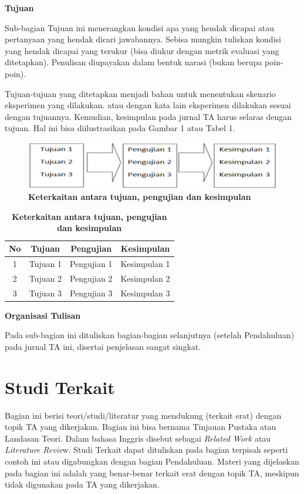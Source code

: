 \noindent\textbf{Tujuan}

Sub-bagian Tujuan ini menerangkan kondisi apa yang hendak dicapai atau pertanyaan yang hendak dicari jawabannya. Sebisa mungkin tuliskan kondisi yang hendak dicapai yang terukur (bisa diukur dengan metrik evaluasi yang ditetapkan).  
Penulisan diupayakan dalam bentuk narasi (bukan berupa poin-poin).

Tujuan-tujuan yang ditetapkan menjadi bahan untuk menentukan skenario eksperimen yang dilakukan. atau dengan kata lain eksperimen dilakukan sesuai dengan tujuannya. Kemudian, kesimpulan pada jurnal TA harus selaras dengan tujuan. Hal ini bisa diilustrasikan pada Gambar 1 atau Tabel 1.
\begin{figure}[h!]
\centering
\includegraphics[scale=0.30]{Tujuan.png}
\caption{\textbf{Keterkaitan antara tujuan, pengujian dan kesimpulan}}
\label{fig:tujuan}
\end{figure}

\begin{table}[h!]
\caption{\textbf{Keterkaitan antara tujuan, pengujian dan kesimpulan}}
\label{table:1}%
\centering
\begin{tabular}{| c | c  | c | c |} 
 \hline
 \textbf{No} & \textbf{Tujuan} & \textbf{Pengujian} & \textbf{Kesimpulan} \\ [0.5ex] 
 \hline
 1 & Tujuan 1 & Pengujian 1 & Kesimpulan 1 \\ 
 2 & Tujuan 2 & Pengujian 2 & Kesimpulan 2 \\ 
 3 & Tujuan 3 & Pengujian 3 & Kesimpulan 3 \\  [1ex] 
 \hline
\end{tabular}

\end{table}

\noindent \textbf{Organisasi Tulisan}

Pada sub-bagian ini dituliskan bagian-bagian selanjutnya (setelah Pendahuluan) pada jurnal TA ini, disertai penjelasan sangat singkat.

\section{Studi Terkait}
Bagian ini berisi teori/studi/literatur yang mendukung (terkait erat) dengan topik TA yang dikerjakan. Bagian ini bisa bernama Tinjauan Pustaka atau Landasan Teori. Dalam bahasa Inggris disebut sebagai  \textit{Related Work} atau \textit{Literature Revie}w. Studi Terkait dapat dituliskan pada bagian terpisah seperti contoh ini atau digabungkan dengan bagian Pendahuluan. Materi yang dijelaskan pada bagian ini adalah yang benar-benar terkait erat dengan topik TA, meskipun tidak digunakan pada TA yang dikerjakan. 

